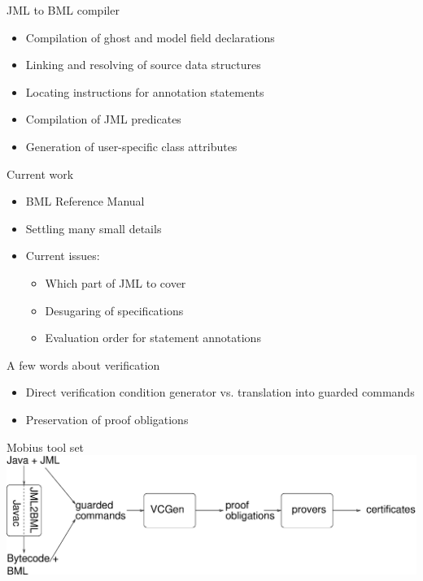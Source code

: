 \documentclass[final,nocolorBG,a4,mobius,nototal,pdf,slideColor]{prosper}
\begin{document}
\begin{slide}{JML to BML compiler}
\begin{itemize}
\item Compilation of ghost and model field declarations

\item Linking and resolving of source data structures

\item Locating instructions for annotation statements

\item Compilation of JML predicates

\item Generation of user-specific class attributes
\end{itemize}
\end{slide}

\begin{slide}{Current work}
\begin{itemize}
\item BML Reference Manual
\item Settling many small details
\item Current issues:
\begin{itemize}
\item Which part of JML to cover
\item Desugaring of specifications
\item Evaluation order for statement annotations
\end{itemize}
\end{itemize}
\end{slide}

\begin{slide}{A few words about verification}
\begin{itemize}
\item Direct verification condition generator vs. translation into guarded commands 
\item Preservation of proof obligations
\end{itemize}
\end{slide}

\begin{slide}{Mobius tool set}
\includegraphics[width=\textwidth]{toolset.eps}

\end{slide}
\end{document}
